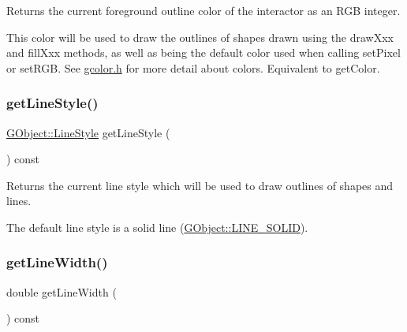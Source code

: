 Returns the current foreground outline color of the interactor as an R\+GB integer. 

This color will be used to draw the outlines of shapes drawn using the draw\+Xxx and fill\+Xxx methods, as well as being the default color used when calling set\+Pixel or set\+R\+GB. See \mbox{\hyperlink{gcolor_8h_source}{gcolor.\+h}} for more detail about colors. Equivalent to get\+Color. \mbox{\label{classsgl_1_1GDrawingSurface_aaf1f5ea8281e5e3486662878d26f0a13}} 
\subsubsection{\texorpdfstring{get\+Line\+Style()}{getLineStyle()}}
{\footnotesize\ttfamily \mbox{\hyperlink{classsgl_1_1GObject_a86e0f5648542856159bb40775c854aa7}{G\+Object\+::\+Line\+Style}} get\+Line\+Style (\begin{DoxyParamCaption}{ }\end{DoxyParamCaption}) const\hspace{0.3cm}{\ttfamily [virtual]}}



Returns the current line style which will be used to draw outlines of shapes and lines. 

The default line style is a solid line (\mbox{\hyperlink{classsgl_1_1GObject_a86e0f5648542856159bb40775c854aa7a700c78bc2cd76acaab26651bf7b4941f}{G\+Object\+::\+L\+I\+N\+E\+\_\+\+S\+O\+L\+ID}}). \mbox{\label{classsgl_1_1GDrawingSurface_a85ff266dc3eb63d9f2d8e5a4487fd3c0}} 
\subsubsection{\texorpdfstring{get\+Line\+Width()}{getLineWidth()}}
{\footnotesize\ttfamily double get\+Line\+Width (\begin{DoxyParamCaption}{ }\end{DoxyParamCaption}) const\hspace{0.3cm}{\ttfamily [virtual]}}



